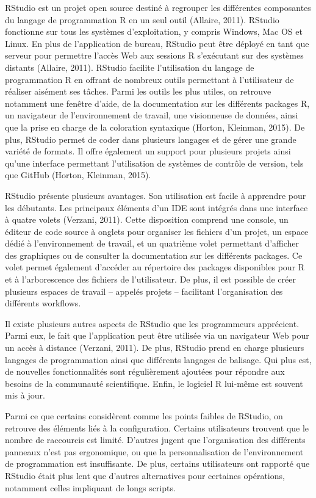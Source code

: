 \documentclass[
  letterpaper,
  DIV=11,
  numbers=noendperiod]{scrreprt}
\begin{document}
RStudio est un projet open source destiné à regrouper les différentes
composantes du langage de programmation R en un seul outil (Allaire,
2011). RStudio fonctionne sur tous les systèmes d'exploitation, y
compris Windows, Mac OS et Linux. En plus de l'application de bureau,
RStudio peut être déployé en tant que serveur pour permettre l'accès Web
aux sessions R s'exécutant sur des systèmes distants (Allaire, 2011).
RStudio facilite l'utilisation du langage de programmation R en offrant
de nombreux outils permettant à l'utilisateur de réaliser aisément ses
tâches. Parmi les outils les plus utiles, on retrouve notamment une
fenêtre d'aide, de la documentation sur les différents packages R, un
navigateur de l'environnement de travail, une visionneuse de données,
ainsi que la prise en charge de la coloration syntaxique (Horton,
Kleinman, 2015). De plus, RStudio permet de coder dans plusieurs
langages et de gérer une grande variété de formats. Il offre également
un support pour plusieurs projets ainsi qu'une interface permettant
l'utilisation de systèmes de contrôle de version, tels que GitHub
(Horton, Kleinman, 2015).

RStudio présente plusieurs avantages. Son utilisation est facile à
apprendre pour les débutants. Les principaux éléments d'un IDE sont
intégrés dans une interface à quatre volets (Verzani, 2011). Cette
disposition comprend une console, un éditeur de code source à onglets
pour organiser les fichiers d'un projet, un espace dédié à
l'environnement de travail, et un quatrième volet permettant d'afficher
des graphiques ou de consulter la documentation sur les différents
packages. Ce volet permet également d'accéder au répertoire des packages
disponibles pour R et à l'arborescence des fichiers de l'utilisateur. De
plus, il est possible de créer plusieurs espaces de travail -- appelés
projets -- facilitant l'organisation des différents workflows.

Il existe plusieurs autres aspects de RStudio que les programmeurs
apprécient. Parmi eux, le fait que l'application peut être utilisée via
un navigateur Web pour un accès à distance (Verzani, 2011). De plus,
RStudio prend en charge plusieurs langages de programmation ainsi que
différents langages de balisage. Qui plus est, de nouvelles
fonctionnalités sont régulièrement ajoutées pour répondre aux besoins de
la communauté scientifique. Enfin, le logiciel R lui-même est souvent
mis à jour.

Parmi ce que certains considèrent comme les points faibles de RStudio,
on retrouve des éléments liés à la configuration. Certains utilisateurs
trouvent que le nombre de raccourcis est limité. D'autres jugent que
l'organisation des différents panneaux n'est pas ergonomique, ou que la
personnalisation de l'environnement de programmation est insuffisante.
De plus, certains utilisateurs ont rapporté que RStudio était plus lent
que d'autres alternatives pour certaines opérations, notamment celles
impliquant de longs scripts.
\end{document}
